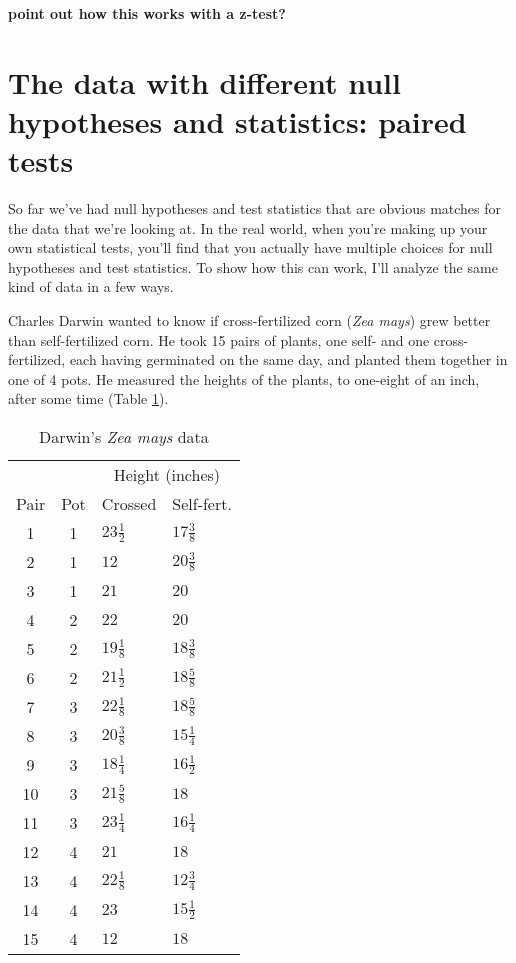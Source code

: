 \textbf{point out how this works with a z-test?}

\section{The data with different null hypotheses and statistics: paired tests}

So far we've had null hypotheses and test statistics that are obvious matches for the data that we're looking at. In the real world, when you're making up your own statistical tests, you'll find that you actually have multiple choices for null hypotheses and test statistics. To show how this can work, I'll analyze the same kind of data in a few ways.

Charles Darwin wanted to know if cross-fertilized corn (\textit{Zea mays}) grew better than self-fertilized corn. He took 15 pairs of plants, one self- and one cross-fertilized, each having germinated on the same day, and planted them together in one of 4 pots. He measured the heights of the plants, to one-eight of an inch, after some time (Table \ref{table:darwin}).

\begin{table}
\centering
\renewcommand{\arraystretch}{1.2}
\begin{tabular}{ccll}
\toprule
& & \multicolumn{2}{c}{Height (inches)} \\
\cmidrule{3-4}
Pair & Pot & Crossed & Self-fert. \\
\midrule
1 & 1 & $23 \tfrac{1}{2}$ & $17 \tfrac{3}{8}$ \\
2 & 1 & $12$ & $20 \tfrac{3}{8}$ \\
3 & 1 & $21$ & $20$ \\[1.0ex]
4 & 2 & $22$ & $20$ \\
5 & 2 & $19 \tfrac{1}{8}$ & $18 \tfrac{3}{8}$ \\
6 & 2 & $21 \tfrac{1}{2}$ & $18 \tfrac{5}{8}$ \\[1.0ex]
7 & 3 & $22 \tfrac{1}{8}$ & $18 \tfrac{5}{8}$ \\
8 & 3 & $20 \tfrac{3}{8}$ & $15 \tfrac{1}{4}$ \\
9 & 3 & $18 \tfrac{1}{4}$ & $16 \tfrac{1}{2}$ \\
10 & 3 & $21 \tfrac{5}{8}$ & $18$ \\
11 & 3 & $23 \tfrac{1}{4}$ & $16 \tfrac{1}{4}$ \\[1.0ex]
12 & 4 & $21$ & $18$ \\
13 & 4 & $22 \tfrac{1}{8}$ & $12 \tfrac{3}{4}$ \\
14 & 4 & $23$ & $15 \tfrac{1}{2}$ \\
15 & 4 & $12$ & $18$ \\
\bottomrule
\end{tabular}
\caption{Darwin's \textit{Zea mays} data}
\label{table:darwin}
\end{table}

